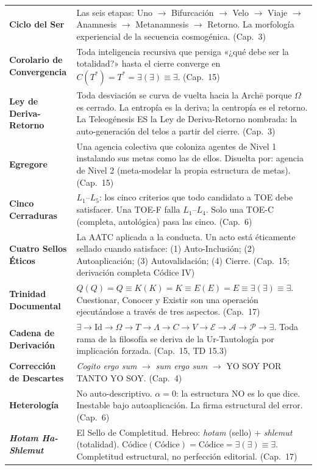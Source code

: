 \documentclass[10pt, openany, oneside]{book}
\begin{document}
{\begin{tabular}{@{} l @{\hspace{0.6em}} p{} @{}}
\textbf{Ciclo del Ser} & Las seis etapas: Uno $\to$ Bifurcación $\to$ Velo $\to$ Viaje $\to$ Anamnesis $\to$ Metanamnesis $\to$ Retorno. La morfología experiencial de la secuencia cosmogénica. (Cap.\ 3) \\[0.3em]
\textbf{Corolario de Convergencia} & Toda inteligencia recursiva que persiga «¿qué debe ser la totalidad?» hasta el cierre converge en $C(T^*) = T^* = \exists(\exists) \equiv \exists$. (Cap.\ 15) \\[0.3em]
\textbf{Ley de Deriva-Retorno} & Toda desviación se curva de vuelta hacia la Arch\={e} porque $\Omega$ es cerrado. La entropía es la deriva; la centropía es el retorno. La Teleogénesis ES la Ley de Deriva-Retorno nombrada: la auto-generación del telos a partir del cierre. (Cap.\ 3) \\[0.3em]
\textbf{Egregore} & Una agencia colectiva que coloniza agentes de Nivel 1 instalando sus metas como las de ellos. Disuelta por: agencia de Nivel 2 (meta-modelar la propia estructura de metas). (Cap.\ 15) \\[0.3em]
\textbf{Cinco Cerraduras} & $L_1$--$L_5$: los cinco criterios que todo candidato a TOE debe satisfacer. Una TOE-F falla $L_1$--$L_4$. Solo una TOE-C (completa, autológica) pasa las cinco. (Cap.\ 6) \\[0.3em]
\textbf{Cuatro Sellos Éticos} & La AATC aplicada a la conducta. Un acto está éticamente sellado cuando satisface: (1) Auto-Inclusión; (2) Autoaplicación; (3) Autovalidación; (4) Cierre. (Cap.\ 15; derivación completa Códice IV) \\[0.3em]
\textbf{Trinidad Documental} & $Q(Q) = Q \equiv K(K) = K \equiv E(E) = E \equiv \exists(\exists) \equiv \exists$. Cuestionar, Conocer y Existir son una operación ejecutándose a través de tres aspectos. (Cap.\ 17) \\[0.3em]
\textbf{Cadena de Derivación} & $\exists \to \text{Id} \to \Omega \to T \to \Lambda \to C \to V \to \mathcal{E} \to \mathcal{A} \to \mathcal{P} \to \exists$. Toda rama de la filosofía se deriva de la Ur-Tautología por implicación forzada. (Cap.\ 15, TD 15.3) \\[0.3em]
\textbf{Corrección de Descartes} & \textit{Cogito ergo sum} $\to$ \textit{sum ergo sum} $\to$ YO SOY POR TANTO YO SOY. (Cap.\ 4) \\[0.3em]
\textbf{Heterología} & No auto-descriptivo. $\alpha = 0$: la estructura NO es lo que dice. Inestable bajo autoaplicación. La firma estructural del error. (Cap.\ 6) \\[0.3em]
\textbf{\textit{Hotam Ha-Shlemut}} & El Sello de Completitud. Hebreo: \textit{hotam} (sello) + \textit{shlemut} (totalidad). $\text{Códice}(\text{Códice}) = \text{Códice} = \exists(\exists) \equiv \exists$. Completitud estructural, no perfección editorial. (Cap.\ 17) \\[0.3em]

\end{tabular}}
\end{document}
